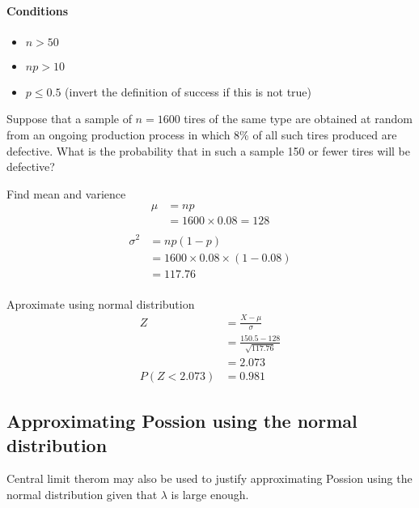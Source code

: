         \paragraph{Conditions}
        \begin{itemize}
            \item $n > 50$
            \item $np > 10$
            \item $p \leq 0.5$ (invert the definition of success if this is not true)
        \end{itemize}

        \begin{example}
        {
        Suppose that a sample of $n = 1600$ tires of the same type are obtained at random from an ongoing production process in which 8\% of all such tires produced are defective. What is the probability that in such a sample 150 or fewer tires will be defective?
        }

        \begin{step}{Find mean and varience}
        \begin{align*}
        \mu &= np\\
        &= 1600 \times 0.08 = 128\\
        \end{align*}
        \begin{align*}
        \sigma^2 &= np(1-p)\\
        &= 1600 \times 0.08 \times (1 - 0.08)\\
        &= 117.76\\
        \end{align*}
        \end{step}

        \begin{step}{Aproximate using normal distribution}
        \begin{align*}
        Z &= \frac{X - \mu}{\sigma} \\
        &= \frac{150.5 - 128}{\sqrt{117.76}}\\
        &= 2.073\\
        P(Z < 2.073) &= 0.981
        \end{align*}
        \end{step}

        \end{example}

    \newpage
    \subsection{Approximating Possion using the normal distribution}
        Central limit therom may also be used to justify approximating Possion using the normal distribution given that $\lambda$ is large enough.

